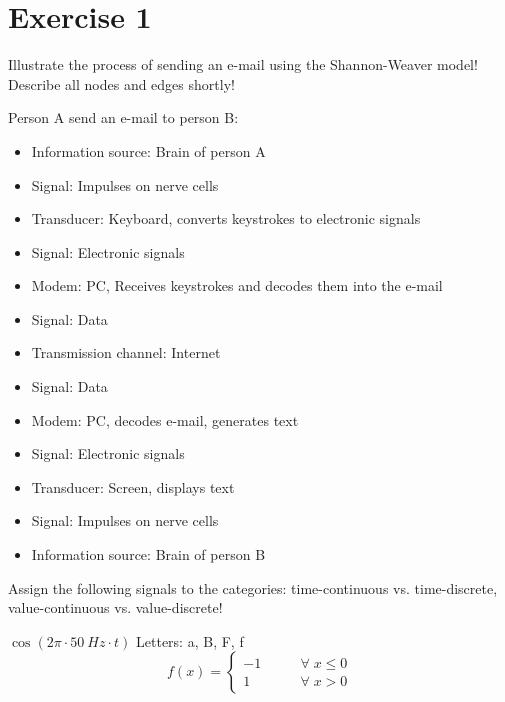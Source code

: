 {}
\section*{Exercise 1}

\begin{question}[subtitle={Shannon-Weaver Model}]
	Illustrate the process of sending an e-mail using the Shannon-Weaver model! Describe all nodes and edges shortly!
\end{question}

\begin{solution}
	Person A send an e-mail to person B:
	\begin{itemize}
		\item Information source: Brain of person A
		\item Signal: Impulses on nerve cells
		\item Transducer: Keyboard, converts keystrokes to electronic signals
		\item Signal: Electronic signals
		\item Modem: PC, Receives keystrokes and decodes them into the e-mail
		\item Signal: Data
		\item Transmission channel: Internet
		\item Signal: Data
		\item Modem: PC, decodes e-mail, generates text
		\item Signal: Electronic signals
		\item Transducer: Screen, displays text
		\item Signal: Impulses on nerve cells
		\item Information source: Brain of person B
	\end{itemize}
\end{solution}

\begin{question}[subtitle={Classes of Signals}]
	Assign the following signals to the categories: time-continuous vs. time-discrete, value-continuous vs. value-discrete!
	\begin{tasks}
		\task
		$\cos\left(2 \pi \cdot \SI{50}{Hz} \cdot t\right)$
		\task
		Letters: a, B, F, f
		\task
		\begin{equation*}
			f(x) = \begin{cases}
				-1 & \qquad \forall \; x \leq 0 \\
				1 & \qquad \forall \; x > 0
			\end{cases}
		\end{equation*}
	\end{tasks}
\end{question}

